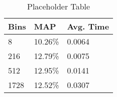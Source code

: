\begin{table}[H]
    \centering
    \caption{Placeholder Table}
    \begin{tabular}{|l|l|l|}
    \hline
    \textbf{Bins} & \textbf{MAP} & \textbf{Avg. Time} \\ \hline
    8             & 10.26\%      & 0.0064             \\ \hline
    216           & 12.79\%      & 0.0075             \\ \hline
    512           & 12.95\%      & 0.0141             \\ \hline
    1728          & 12.52\%      & 0.0307             \\ \hline
    \end{tabular}%
\end{table}